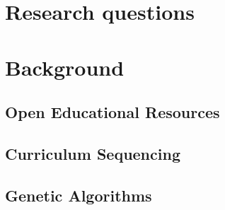\section{Research questions}
\section{Background}
\subsection{Open Educational Resources}
\subsection{Curriculum Sequencing}
\subsection{Genetic Algorithms}
